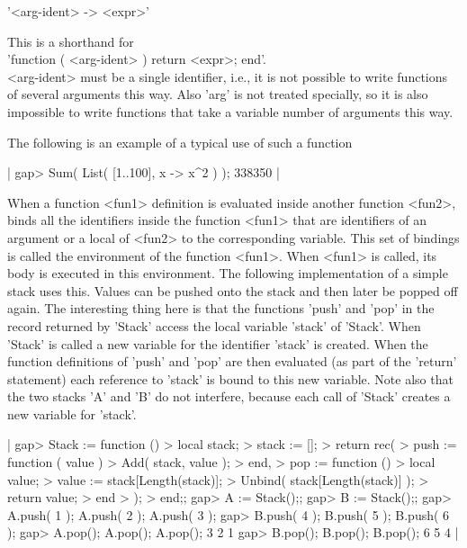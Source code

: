'<arg-ident> -> <expr>'

This  is a  shorthand for\\
'function (  <arg-ident> ) return <expr>; end'.\\
<arg-ident>  must  be  a single  identifier, i.e., it is  not possible to
write functions of several arguments this way.  Also 'arg' is not treated
specially,  so  it  is  also impossible to  write  functions that take  a
variable number of arguments this way.

The following is an example of a typical use of such a function

|    gap> Sum( List( [1..100], x -> x^2 ) );
    338350 |

When a function <fun1> definition  is evaluated  inside  another function
<fun2>, {\GAP}  binds all the identifiers inside the function <fun1> that
are identifiers of an argument or a  local of <fun2> to the corresponding
variable.  This set of bindings is called the environment of the function
<fun1>.  When <fun1> is called, its body is executed in this environment.
The  following implementation of a simple stack uses this.  Values can be
pushed  onto  the  stack  and  then  later  be  popped  off  again.   The
interesting thing here  is that the  functions 'push'  and  'pop'  in the
record returned by 'Stack' access the local variable 'stack' of  'Stack'.
When 'Stack' is called a new  variable  for  the  identifier  'stack'  is
created.   When the function  definitions of  'push' and  'pop' are  then
evaluated (as part of the  'return' statement)  each reference to 'stack'
is bound to this new variable.  Note also that the two stacks 'A' and 'B'
do not interfere, because each call of 'Stack' creates a new variable for
'stack'.

|    gap> Stack := function ()
    >         local   stack;
    >         stack := [];
    >         return rec(
    >             push := function ( value )
    >                 Add( stack, value );
    >             end,
    >             pop := function ()
    >                 local   value;
    >                 value := stack[Length(stack)];
    >                 Unbind( stack[Length(stack)] );
    >                 return value;
    >             end
    >         );
    >    end;;
    gap> A := Stack();;
    gap> B := Stack();;
    gap> A.push( 1 );  A.push( 2 );  A.push( 3 );
    gap> B.push( 4 );  B.push( 5 );  B.push( 6 );
    gap> A.pop();  A.pop();  A.pop();
    3
    2
    1
    gap> B.pop();  B.pop();  B.pop();
    6
    5
    4 |


